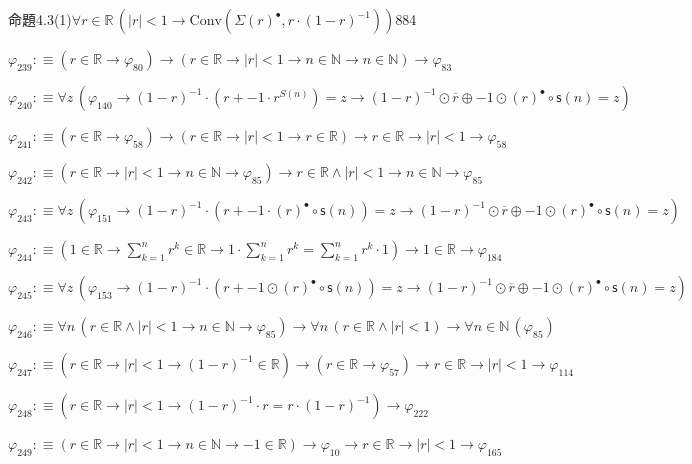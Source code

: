 \begin{fullproof}{命題4.3(1)}{$\forall r \in \mathbb{R}\,(\lvert r \rvert < 1 \to \mathrm{Conv}(\Sigma {(r)^{\bullet}},r \cdot (1 - r)^{-1}))$}{884}
\begin{abbrevlist}
\item $\varphi_{239} :\equiv (r \in \mathbb{R} \to \varphi_{80}) \to (r \in \mathbb{R} \to \lvert r \rvert < 1 \to n \in \mathbb{N} \to n \in \mathbb{N}) \to \varphi_{83}$
\item $\varphi_{240} :\equiv \forall z\,(\varphi_{140} \to (1 - r)^{-1} \cdot (r + -1 \cdot {{r}^{S(n)}}) = z \to (1 - r)^{-1} \odot \overline{r} \oplus -1 \odot {(r)^{\bullet}} \circ \mathsf{s}(n) = z)$
\item $\varphi_{241} :\equiv (r \in \mathbb{R} \to \varphi_{58}) \to (r \in \mathbb{R} \to \lvert r \rvert < 1 \to r \in \mathbb{R}) \to r \in \mathbb{R} \to \lvert r \rvert < 1 \to \varphi_{58}$
\item $\varphi_{242} :\equiv (r \in \mathbb{R} \to \lvert r \rvert < 1 \to n \in \mathbb{N} \to \varphi_{85}) \to r \in \mathbb{R} \land \lvert r \rvert < 1 \to n \in \mathbb{N} \to \varphi_{85}$
\item $\varphi_{243} :\equiv \forall z\,(\varphi_{151} \to (1 - r)^{-1} \cdot (r + -1 \cdot {(r)^{\bullet}} \circ \mathsf{s}(n)) = z \to (1 - r)^{-1} \odot \overline{r} \oplus -1 \odot {(r)^{\bullet}} \circ \mathsf{s}(n) = z)$
\item $\varphi_{244} :\equiv (1 \in \mathbb{R} \to {\textstyle\sum_{k=1}^{n} {{r}^{k}}} \in \mathbb{R} \to 1 \cdot {\textstyle\sum_{k=1}^{n} {{r}^{k}}} = {\textstyle\sum_{k=1}^{n} {{r}^{k}}} \cdot 1) \to 1 \in \mathbb{R} \to \varphi_{184}$
\item $\varphi_{245} :\equiv \forall z\,(\varphi_{153} \to (1 - r)^{-1} \cdot (r + -1 \odot {(r)^{\bullet}} \circ \mathsf{s}(n)) = z \to (1 - r)^{-1} \odot \overline{r} \oplus -1 \odot {(r)^{\bullet}} \circ \mathsf{s}(n) = z)$
\item $\varphi_{246} :\equiv \forall n\,(r \in \mathbb{R} \land \lvert r \rvert < 1 \to n \in \mathbb{N} \to \varphi_{85}) \to \forall n\,(r \in \mathbb{R} \land \lvert r \rvert < 1) \to \forall n \in \mathbb{N}\,(\varphi_{85})$
\item $\varphi_{247} :\equiv (r \in \mathbb{R} \to \lvert r \rvert < 1 \to (1 - r)^{-1} \in \mathbb{R}) \to (r \in \mathbb{R} \to \varphi_{57}) \to r \in \mathbb{R} \to \lvert r \rvert < 1 \to \varphi_{114}$
\item $\varphi_{248} :\equiv (r \in \mathbb{R} \to \lvert r \rvert < 1 \to (1 - r)^{-1} \cdot r = r \cdot (1 - r)^{-1}) \to \varphi_{222}$
\item $\varphi_{249} :\equiv (r \in \mathbb{R} \to \lvert r \rvert < 1 \to n \in \mathbb{N} \to -1 \in \mathbb{R}) \to \varphi_{10} \to r \in \mathbb{R} \to \lvert r \rvert < 1 \to \varphi_{165}$

\end{abbrevlist}
\end{fullproof}

